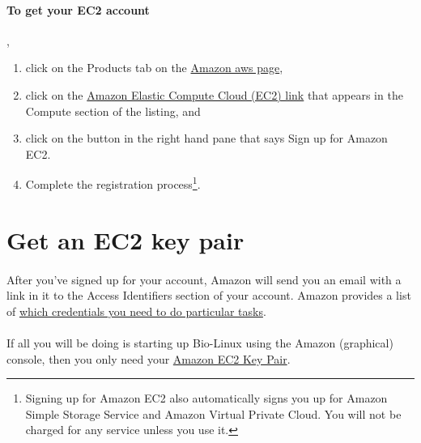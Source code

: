 \paragraph{To get your EC2 account}, 
\begin{enumerate}
\item click on the Products tab on the \href{http://aws.amazon.com}{Amazon aws page},
\item click on the \href{http://aws.amazon.com/ec2/}{Amazon Elastic Compute Cloud (EC2) link} that appears in the Compute section of the listing, and
\item click on the button in the right hand pane that says Sign up for Amazon EC2.  
\item Complete the registration process\footnote{Signing up for Amazon EC2 also automatically signs you up for Amazon Simple Storage Service and Amazon Virtual Private Cloud. You will not be charged for any service unless you use it.}.
\end{enumerate}

\section{Get an EC2 key pair}

\paragraph{}After you've signed up for your account, Amazon will send you an email with a link in it to the Access Identifiers section of your account. Amazon provides a list of \href{http://docs.amazonwebservices.com/AWSSecurityCredentials/1.0/AboutAWSCredentials.html#EC2Credentials}{which credentials you need to do particular tasks}. 

\paragraph{}If all you will be doing is starting up Bio-Linux using the Amazon (graphical) console, then you only need your \href{http://docs.amazonwebservices.com/AWSSecurityCredentials/1.0/AboutAWSCredentials.html#EC2KeyPairs}{Amazon EC2 Key Pair}. 


